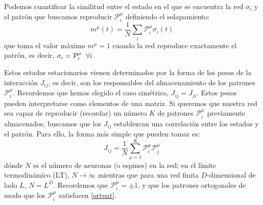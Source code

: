 \documentclass[titlepage,12pt]{article}
\numberwithin{equation}{section}
\begin{document}
	Podemos cuantificar la similitud entre el estado en el que se encuentra la red $\sigma_i$ y el patrón que buscamos reproducir $\mathcal{P}^\mu_i$ definiendo el solapamiento:
	\begin{equation}
	m^\mu(t)=\frac{1}{N}\sum_i \mathcal{P}^\mu_i\sigma_i(t)
	\label{overlap}
	\end{equation}
	que toma el valor máximo $m^\mu = 1$ cuando la red reproduce exactamente el patrón, es decir, $\sigma_i = \mathcal{P}^\mu_i\hspace{0.2cm}\forall i$.
	
	Estos estados estacionarios vienen determinados por la forma de los pesos de la interacción $J_{ij}$, es decir, son los responsables del almacenamiento de los patrones $\mathcal{P}^\mu_i$. Recordemos que hemos elegido el caso simétrico, $J_{ij}=J_{ji}$. Estos pesos pueden interpretarse como elementos de una matriz. Si queremos que nuestra red sea capaz de reproducir (recordar) un número $K$ de patrones $\mathcal{P}^\mu_i$ previamente almacenados, buscamos que los $J_{ij}$ establezcan una correlación entre los estados y el patrón. Para ello, la forma más simple que pueden tomar es:
	\begin{equation}
	J_{ij}=\frac{1}{N}\sum_{\mu=1}^K \mathcal{P}^\mu_i \mathcal{P}^\mu_j
	\label{Jint}
	\end{equation}
	dónde $N$ es el número de neuronas (o espines) en la red; en el límite termodinámico (LT), $N\rightarrow\infty$ mientras que para una red finita $D$-dimensional de lado $L$, $N=L^D$. Recordemos que $\mathcal{P}^\mu_i = \pm1$, y que los patrones ortogonales de modo que los $\mathcal{P}^\mu_i$ satisfacen \eqref{ortpat}.
\end{document}
